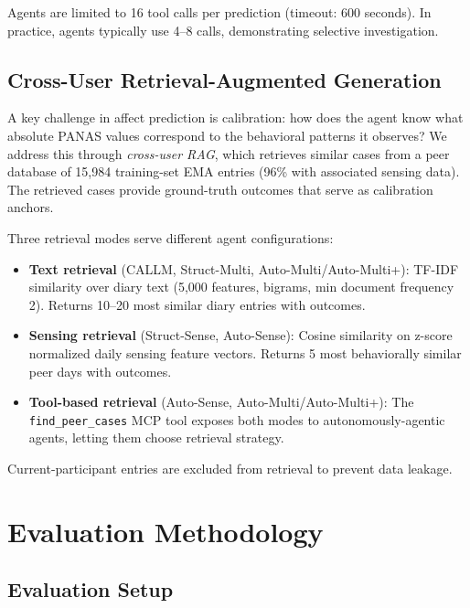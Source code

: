 \documentclass[screen,review,anonymous]{acmart}
\begin{document}
\noindent Agents are limited to 16 tool calls per prediction (timeout: 600 seconds). In practice, agents typically use 4--8 calls, demonstrating selective investigation.

\subsection{Cross-User Retrieval-Augmented Generation}

A key challenge in affect prediction is calibration: how does the agent know what absolute PANAS values correspond to the behavioral patterns it observes? We address this through \emph{cross-user RAG}, which retrieves similar cases from a peer database of 15,984 training-set EMA entries (96\% with associated sensing data). The retrieved cases provide ground-truth outcomes that serve as calibration anchors.

Three retrieval modes serve different agent configurations:
\begin{itemize}[nosep]
    \item \textbf{Text retrieval} (CALLM, Struct-Multi, Auto-Multi/Auto-Multi+): TF-IDF similarity over diary text (5,000 features, bigrams, min document frequency 2). Returns 10--20 most similar diary entries with outcomes.
    \item \textbf{Sensing retrieval} (Struct-Sense, Auto-Sense): Cosine similarity on z-score normalized daily sensing feature vectors. Returns 5 most behaviorally similar peer days with outcomes.
    \item \textbf{Tool-based retrieval} (Auto-Sense, Auto-Multi/Auto-Multi+): The \texttt{find\_peer\_cases} MCP tool exposes both modes to autonomously-agentic agents, letting them choose retrieval strategy.
\end{itemize}

\noindent Current-participant entries are excluded from retrieval to prevent data leakage.


\section{Evaluation Methodology}

\subsection{Evaluation Setup}
\end{document}
